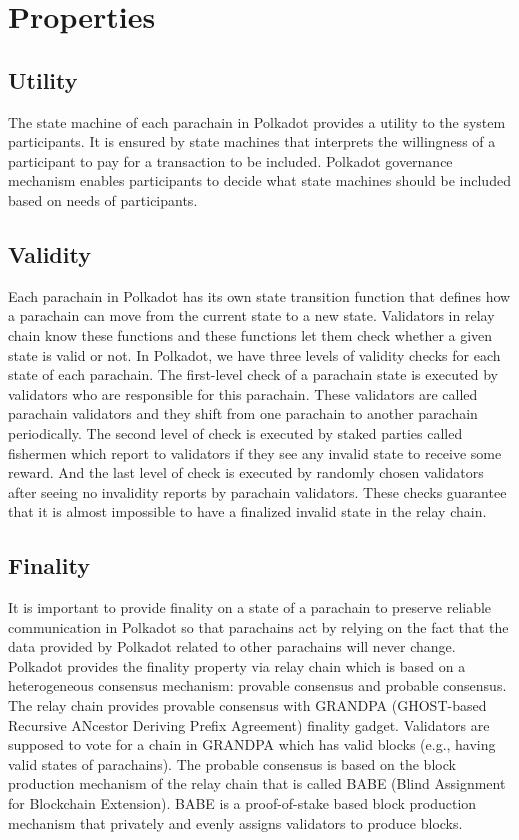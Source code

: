 \section{Properties}

 \subsection{Utility}

 The state machine of each parachain in Polkadot provides a utility to the system participants. It is ensured by state machines that interprets the willingness of a participant to pay for a transaction to be included.  Polkadot governance mechanism enables participants to decide what state machines should be included based on needs of participants.
 


 \subsection{Validity}
Each parachain in Polkadot has its own state transition function that defines how a parachain can move from the current state to a new state.   Validators in relay chain  know these functions and these functions let them  check whether a given state is valid or not.  In Polkadot, we have three levels of validity checks for each state of each parachain. The first-level check of a parachain state is executed by validators who are responsible for this parachain. These validators are called parachain validators and they shift from one parachain to another parachain periodically. The second level of check is executed by staked parties called fishermen which report to validators if they see any invalid state to receive some reward. And the last level of check is executed by randomly chosen validators after seeing no invalidity reports by parachain validators. These checks guarantee that it is almost impossible to have a finalized invalid state in the relay chain.

 \subsection{Finality}

 It is important to provide finality on a state of a parachain to preserve reliable communication in Polkadot so that parachains act by relying on the fact that the data provided by Polkadot related to other parachains will never change.  Polkadot provides the finality property via relay chain which is based on a heterogeneous consensus mechanism: provable consensus and probable consensus. The relay chain provides provable consensus with GRANDPA (GHOST-based Recursive ANcestor Deriving Prefix Agreement)  finality gadget. Validators are supposed to vote for a chain in GRANDPA  which has valid blocks (e.g., having valid states of parachains). The probable consensus is based on the block production mechanism of the relay chain that is called BABE (Blind Assignment for Blockchain Extension). BABE is a proof-of-stake based block production mechanism that privately and evenly assigns validators to produce blocks.

